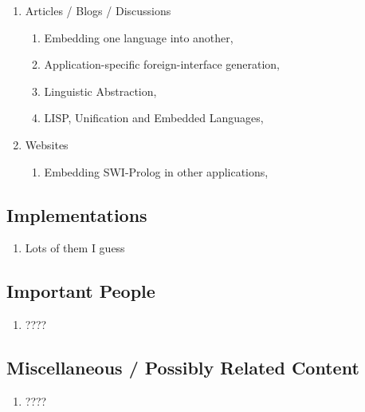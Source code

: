 \documentclass[proposal.tex]{subfiles}
\begin{document}
\begin{enumerate}
\item Articles / Blogs / Discussions
\begin{enumerate}
\item Embedding one language into another, \cite{website:lambda-the-ultimate-2}
\item Application-specific foreign-interface generation, \cite{website:lambda-the-ultimate-3}
\item Linguistic Abstraction, \cite{audklangembedd}
\item LISP, Unification and Embedded Languages, \cite{ummlisp}
\end{enumerate}
\item Websites
\begin{enumerate}
\item Embedding SWI-Prolog in other applications, \cite{swipembedd}
\end{enumerate}
\end{enumerate}

\subsection{Implementations}
\begin{enumerate}
\item Lots of them I guess
\end{enumerate}

\subsection{Important People}
\begin{enumerate}
\item ????
\end{enumerate}

\subsection{Miscellaneous / Possibly Related Content}
\begin{enumerate}
\item ????
\end{enumerate}
\end{document}
